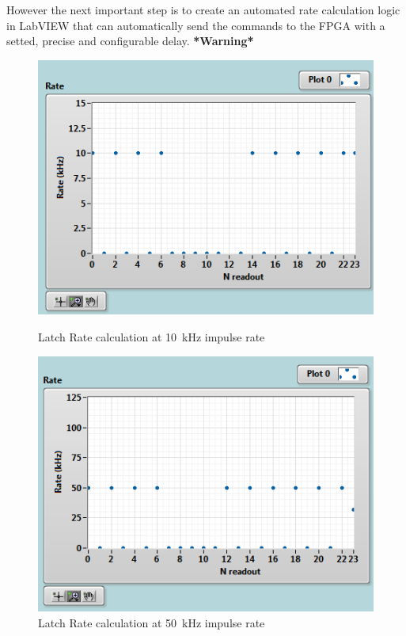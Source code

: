 However the next important step is to create an automated rate calculation logic in LabVIEW that can automatically send the commands to the FPGA with a setted, precise and configurable delay. \textbf{*Warning*}
\begin{figure}[H]
	\centering
	\begin{minipage}{0.49\textwidth}
		\centering
		\includegraphics[width=.95\linewidth]{IMG/ch5/latch_tests/fig3.PNG}
		\caption{Latch Rate calculation at 10~kHz impulse rate}
		\label{fig:latchrate10}
	\end{minipage}%
	\begin{minipage}{0.49\textwidth}
		\centering
		\includegraphics[width=.95\linewidth]{IMG/ch5/latch_tests/fig5.PNG}
		\caption{Latch Rate calculation at 50~kHz impulse rate}
		\label{fig:latchrate50}
	\end{minipage}
\end{figure}
